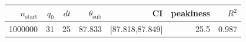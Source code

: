 \begin{tabular}{r r r r r r r}
\hline
$n_{\mathrm{start}}$ & $q_0$ & $dt$ & $\theta_{\mathrm{sub}}$ & CI & peakiness & $R^2$ \\
\hline
1000000 & 31 & 25 & 87.833 & [87.818,87.849] & 25.5 & 0.987 \\
\hline
\end{tabular}
